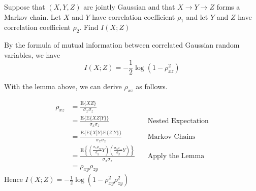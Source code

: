 \begin{exercise}{Suppose that $(X, Y, Z)$ are jointly Gaussian and that $X \rightarrow Y \rightarrow Z$ forms a Markov chain. Let $X$ and $Y$ have correlation coefficient $\rho_{1}$ and let $Y$ and $Z$ have correlation coefficient $\rho_{2} .$ Find $I(X ; Z)$}
  \begin{solution} By the formula of mutual information between correlated Gaussian random variables, we have
    \begin{equation}
      I(X;Z) = -\frac{1}{2} \log (1-\rho_{xz} ^2)
    \end{equation}

  With the lemma above, we can derive $\rho_{xz}$ as follows.

  \begin{equation}
      \begin{aligned}
      \rho_{x z} &=\frac{\mathrm{E}\{X Z\}}{\sigma_{x} \sigma_{z}} \\
      &=\frac{\mathrm{E}\{\mathrm{E}\{X Z | Y\}\}}{\sigma_{x} \sigma_{z}} &\quad {\text{Nested Expectation}} \\
      &=\frac{\mathrm{E}\{\mathrm{E}\{X | Y\} \mathrm{E}\{Z | Y\}\}}{\sigma_{x} \sigma_{z}} &\quad {\text{Markov Chains}}\\
      &=\frac{\mathrm{E}\left\{\left(\frac{\sigma_{x} \rho_{x y}}{\sigma_{y}} Y\right)\left(\frac{\sigma_{z} \rho_{z x}}{\sigma_{y}} Y\right)\right\}}{\sigma_{x} \sigma_{z}} &\quad {\text{Apply the Lemma}} \\
      &=\rho_{x y} \rho_{z y}
      \end{aligned}
  \end{equation}
  Hence $I(X;Z) = -\frac{1}{2} \log (1 -\rho_{x y}^2 \rho_{z y}^2 )$
  \end{solution}
  \label{ex8-5}
\end{exercise}